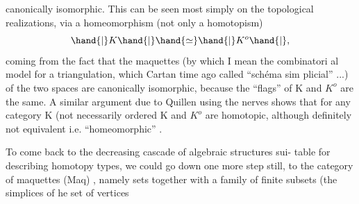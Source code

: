 canonically isomorphic.  This can be seen most simply on the topological
realizations,  via a homeomorphism (not only a homotopism)
\[ \hand{|}K\hand{|} \hand{\simeq} \hand{|}K^{o}\hand{|} , \]
coming from the fact that the maquettes (by which I mean the combinatori%
 al model  for a triangulation,  which  Cartan time ago called ``schéma sim%
plicial'' ...) of the two spaces are canonically isomorphic,  because
the ``flags'' of K and $K^{o}$ are the same.  A similar argument due to Quillen
using the nerves shows that for any category K  (not necessarily ordered\unsure{\hand{)}}
K and $K^{o}$ are homotopic,  although  definitely not equivalent i.e. 
``homeomorphic'' .

To come back to the decreasing cascade of algebraic structures sui-%
table for describing homotopy types,  we could go down one more step
still,  to the category of  maquettes  (Maq) ,  namely sets  together
with a family  of finite subsets (the simplices of he set of vertices
